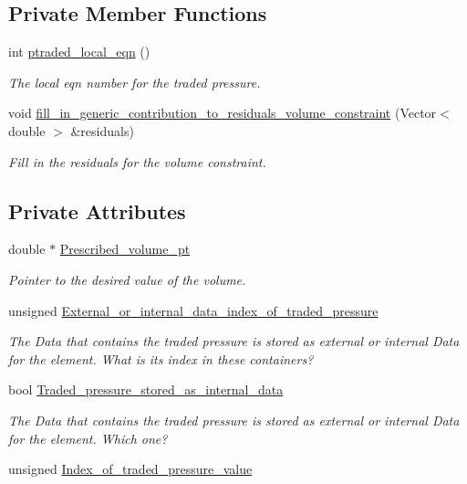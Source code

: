 \subsection*{Private Member Functions}
\begin{DoxyCompactItemize}
\item 
int \hyperlink{classoomph_1_1VolumeConstraintElement_ad0dedf705ccfb713848ad960bf1b901d}{ptraded\+\_\+local\+\_\+eqn} ()
\begin{DoxyCompactList}\small\item\em The local eqn number for the traded pressure. \end{DoxyCompactList}\item 
void \hyperlink{classoomph_1_1VolumeConstraintElement_a1139fafaca2b784c0561457606cc307e}{fill\+\_\+in\+\_\+generic\+\_\+contribution\+\_\+to\+\_\+residuals\+\_\+volume\+\_\+constraint} (Vector$<$ double $>$ \&residuals)
\begin{DoxyCompactList}\small\item\em Fill in the residuals for the volume constraint. \end{DoxyCompactList}\end{DoxyCompactItemize}
\subsection*{Private Attributes}
\begin{DoxyCompactItemize}
\item 
double $\ast$ \hyperlink{classoomph_1_1VolumeConstraintElement_ae109f08c27d29b0749b46285703cb16f}{Prescribed\+\_\+volume\+\_\+pt}
\begin{DoxyCompactList}\small\item\em Pointer to the desired value of the volume. \end{DoxyCompactList}\item 
unsigned \hyperlink{classoomph_1_1VolumeConstraintElement_a51d3b504e02842219a50f043e8cd81f3}{External\+\_\+or\+\_\+internal\+\_\+data\+\_\+index\+\_\+of\+\_\+traded\+\_\+pressure}
\begin{DoxyCompactList}\small\item\em The Data that contains the traded pressure is stored as external or internal Data for the element. What is its index in these containers? \end{DoxyCompactList}\item 
bool \hyperlink{classoomph_1_1VolumeConstraintElement_ac4275cd18ae758b71ba4191aa2ff9a28}{Traded\+\_\+pressure\+\_\+stored\+\_\+as\+\_\+internal\+\_\+data}
\begin{DoxyCompactList}\small\item\em The Data that contains the traded pressure is stored as external or internal Data for the element. Which one? \end{DoxyCompactList}\item 
unsigned \hyperlink{classoomph_1_1VolumeConstraintElement_a4f2dd24f0ae52cc665daab425bf94745}{Index\+\_\+of\+\_\+traded\+\_\+pressure\+\_\+value}
\end{DoxyCompactItemize}


